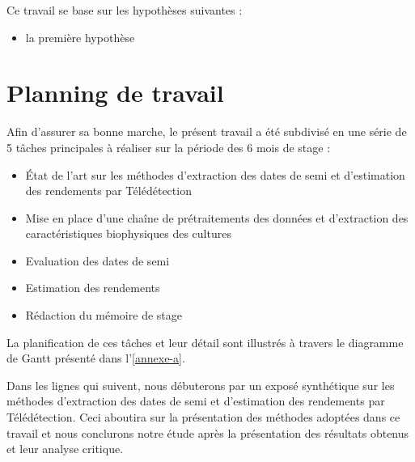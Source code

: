 \vspace{5mm} %

Ce travail se base sur les hypothèses suivantes :
  \begin{itemize}
   \item la première hypothèse
  \end{itemize}

\section{Planning de travail}
Afin d'assurer sa bonne marche, le présent travail a été subdivisé en une série de 5 tâches principales à réaliser sur la période des 6 mois de stage :
  \begin{itemize}
   \item \'Etat de l'art sur les méthodes d'extraction des dates de semi et d'estimation des rendements par Télédétection
   \item Mise en place d'une chaîne de prétraitements des données et d'extraction des caractéristiques biophysiques des cultures
   \item Evaluation des dates de semi
   \item Estimation des rendements
   \item Rédaction du mémoire de stage
  \end{itemize}
La planification de ces tâches et leur détail sont illustrés \`a travers le diagramme de Gantt présenté dans l'\ref{annexe-a}.

\vspace{5mm} %

Dans les lignes qui suivent, nous débuterons par un exposé synthétique sur les méthodes d'extraction des dates de semi et d'estimation des rendements par Télédétection. 
Ceci aboutira sur la présentation des méthodes adoptées dans ce travail et nous conclurons notre étude après la présentation des résultats obtenus et leur analyse critique.